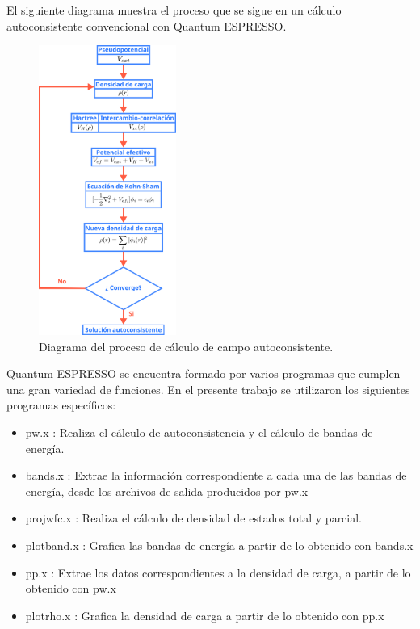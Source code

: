 El siguiente diagrama muestra el proceso que se sigue en un c\'alculo autoconsistente convencional con Quantum ESPRESSO.

\begin{figure}[H]
	\centering
	\includegraphics[width=0.4\textwidth]{contenido/calculos_computacionales/calculos_autoconsistentes/img_autoconsistente/BucleAutoconsistente.png}
	\caption[Diagrama del proceso de c\'alculo de campo 
	autoconsistente]{Diagrama del proceso de c\'alculo de campo 
		autoconsistente.}
\end{figure}

Quantum ESPRESSO se encuentra formado por varios programas que cumplen una 
gran variedad de funciones. En el presente trabajo se utilizaron 
los siguientes programas espec\'ificos:

\begin{itemize}
    \item pw.x : Realiza el c\'alculo de autoconsistencia y el c\'alculo de 
    bandas de energ\'ia.
    \item bands.x : Extrae la informaci\'on correspondiente a cada una 
    de las bandas de energ\'ia, desde los archivos de salida producidos por pw.x
    \item projwfc.x : Realiza el c\'alculo de densidad de estados total y 
    parcial.
    \item plotband.x : Grafica las bandas de energ\'ia a partir de lo obtenido 
    con bands.x
    \item pp.x : Extrae los datos correspondientes a la densidad de carga, a 
    partir de lo obtenido con pw.x
    \item plotrho.x : Grafica la densidad de carga a partir de lo obtenido con 
    pp.x
\end{itemize}


